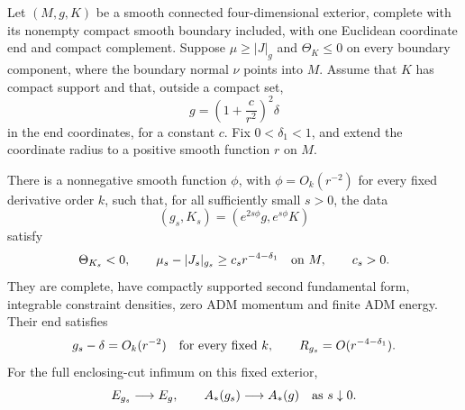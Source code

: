\begin{lemma}
\label{n4:lem:strictification}
Let \((M,g,K)\) be a smooth connected four-dimensional exterior,
complete with its nonempty compact smooth boundary included, with one
Euclidean coordinate end and compact complement.  Suppose
\(\mu\ge |J|_g\) and \(\Theta_K\le0\) on every boundary component,
where the boundary normal \(\nu\) points into \(M\).  Assume that
\(K\) has compact support and that, outside a compact set,
\[
 g=\left(1+\frac{c}{r^2}\right)^2\delta
\]
in the end coordinates, for a constant \(c\).
Fix \(0<\delta_1<1\), and extend the coordinate radius to a positive
smooth function \(r\) on \(M\).

There is a nonnegative smooth function \(\phi\), with
\(\phi=O_k(r^{-2})\) for every fixed derivative order \(k\), such
that, for all sufficiently small \(s>0\), the data
\[
 (g_s,K_s)=(e^{2s\phi}g,e^{s\phi}K)
\]
satisfy
\begin{equation}\label{n4:eq:strictification-output}
 \Theta_{K_s}<0,\qquad
 \mu_s-|J_s|_{g_s}\ge c_s r^{-4-\delta_1}
 \quad\hbox{on }M,\qquad c_s>0.
\end{equation}
They are complete, have compactly supported second fundamental form,
integrable constraint densities, zero ADM momentum and finite ADM
energy.  Their end satisfies
\begin{equation}\label{n4:eq:strictification-decay}
 g_s-\delta=O_k(r^{-2})\quad\hbox{for every fixed }k,
 \qquad R_{g_s}=O(r^{-4-\delta_1}).
\end{equation}
For the full enclosing-cut infimum on this fixed exterior,
\begin{equation}\label{n4:eq:strictification-limits}
 E_{g_s}\longrightarrow E_g,
 \qquad A_*(g_s)\longrightarrow A_*(g)
 \quad\hbox{as }s\downarrow0.
\end{equation}
\end{lemma}

